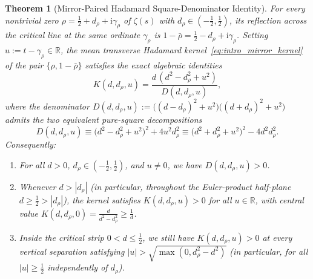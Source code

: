 \documentclass[11pt,reqno]{amsart}
\newtheorem{theorem}{Theorem}[section]
\theoremstyle{definition}
\theoremstyle{remark}
\numberwithin{equation}{section}
\newcommand{\R}{\mathbb{R}}
\newcommand{\ii}{\mathrm{i}}
\begin{document}
\begin{theorem}[Mirror-Paired Hadamard Square-Denominator Identity]\label{thm:mirror_hadamard}
For every nontrivial zero $\rho = \frac{1}{2} + d_\rho + \ii\gamma_\rho$ of $\zeta(s)$ with $d_\rho \in (-\frac{1}{2}, \frac{1}{2})$, its reflection across the critical line at the same ordinate $\gamma_\rho$ is $1 - \bar{\rho} = \frac{1}{2} - d_\rho + \ii\gamma_\rho$. Setting $u := t - \gamma_\rho \in \R$, the mean transverse Hadamard kernel~\eqref{eq:intro_mirror_kernel} of the pair $\{\rho, 1 - \bar{\rho}\}$ satisfies the exact algebraic identities
\begin{equation}\label{eq:K_square_denom}
K(d, d_\rho, u) = \frac{d\,(d^2 - d_\rho^2 + u^2)}{D(d, d_\rho, u)},
\end{equation}
where the denominator $D(d, d_\rho, u) := \bigl((d - d_\rho)^2 + u^2\bigr)\bigl((d + d_\rho)^2 + u^2\bigr)$ admits the two equivalent pure-square decompositions
\begin{equation}\label{eq:D_two_forms}
D(d, d_\rho, u) \equiv \bigl(d^2 - d_\rho^2 + u^2\bigr)^2 + 4u^2 d_\rho^2 \equiv \bigl(d^2 + d_\rho^2 + u^2\bigr)^2 - 4d^2 d_\rho^2.
\end{equation}
Consequently:
\begin{enumerate}[label=\textup{(\roman*)},leftmargin=2.2em]
\item For all $d > 0$, $d_\rho \in (-\frac{1}{2}, \frac{1}{2})$, and $u \neq 0$, we have $D(d, d_\rho, u) > 0$.
\item Whenever $d > |d_\rho|$ (in particular, throughout the Euler-product half-plane $d \ge \frac{1}{2} > |d_\rho|$), the kernel satisfies $K(d, d_\rho, u) > 0$ for all $u \in \R$, with central value $K(d, d_\rho, 0) = \frac{d}{d^2 - d_\rho^2} \ge \frac{1}{d}$.
\item Inside the critical strip $0 < d \le \frac{1}{2}$, we still have $K(d, d_\rho, u) > 0$ at every vertical separation satisfying $|u| > \sqrt{\max(0, d_\rho^2 - d^2)}$ (in particular, for all $|u| \ge \frac{1}{2}$ independently of $d_\rho$).
\end{enumerate}
\end{theorem}
\end{document}
